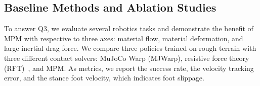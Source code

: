 


\subsection{Baseline Methods and Ablation Studies}
To answer Q3, we evaluate several robotics tasks and demonstrate the benefit of MPM with respective to three axes: material flow, material deformation, and large inertial drag force.
We compare three policies trained on rough terrain with three different contact solvers: MuJoCo Warp (MJWarp), resistive force theory (RFT)~\cite{gmloco}, and MPM.
As metrics, we report the success rate, the velocity tracking error, and the stance foot velocity, which indicates foot slippage.


